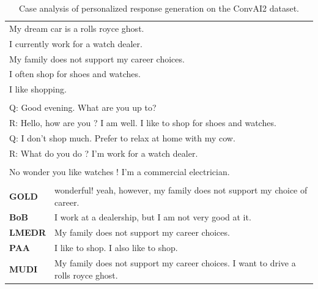 \begin{table}[ht]
\centering
\def\arraystretch{1.6}%
\begin{tabular}{|l|p{11cm}|}

\hline
\rowcolor{yellow}
\multicolumn{2}{|c|}{\textbf{Persona}} \\
\hline
\multicolumn{2}{|l|}{My dream car is a rolls royce ghost.} \\
\multicolumn{2}{|l|}{I currently work for a watch dealer.} \\
\multicolumn{2}{|l|}{My family does not support my career choices.} \\
\multicolumn{2}{|l|}{I often shop for shoes and watches.} \\
\multicolumn{2}{|l|}{I like shopping.} \\
\hline

\rowcolor{yellow}
\multicolumn{2}{|c|}{\textbf{Context}} \\
\hline
\multicolumn{2}{|l|}{Q: Good evening. What are you up to?} \\
\multicolumn{2}{|l|}{R: Hello, how are you ? I am well. I like to shop for shoes and watches.} \\
\multicolumn{2}{|l|}{Q: I don't shop much. Prefer to relax at home with my cow.} \\
\multicolumn{2}{|l|}{R: What do you do ? I'm work for a watch dealer.} \\
\hline

\rowcolor{yellow}
\multicolumn{2}{|c|}{\textbf{Query}} \\
\hline
\multicolumn{2}{|l|}{No wonder you like watches ! I'm a commercial electrician.} \\

\hhline{|==|}
\rowcolor[RGB]{204,217,245}
\multicolumn{2}{|c|}{\textbf{Response}} \\
\hhline{|==|}
\textbf{GOLD} & wonderful! yeah, however, my family does not support my choice of career. \\
\textbf{BoB} & I work at a dealership, but I am not very good at it. \\
\textbf{LMEDR} & My family does not support my career choices. \\
\textbf{PAA} & I like to shop. I also like to shop. \\
\textbf{MUDI} & My family does not support my career choices. I want to drive a rolls royce ghost. \\

\hline
\end{tabular}
\caption{Case analysis of personalized response generation on the ConvAI2 dataset.}
\label{table:case_study_1}
\end{table}

